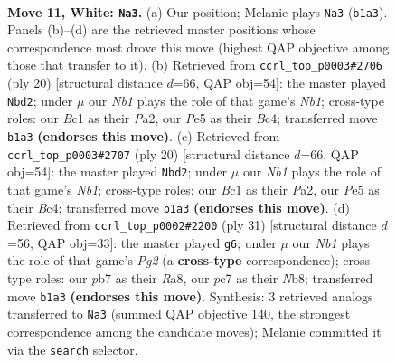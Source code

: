 \documentclass[11pt]{article}
\begin{document}
\clearpage

\begin{figure}[p]\centering
\begin{subfigure}{0.46\textwidth}\centering
\resizebox{\linewidth}{!}{%
\newchessgame
\chessboard[
  setfen={r3k2r/ppp1ppbp/1nn3p1/4P3/6b1/1B3N2/PPP2PPP/RNBK2R1 w kq - 1 11},
  showmover=false,
  pgfstyle=straightmove, color=movearrow, markmove={b1-a3}
]}
\caption{}
\end{subfigure}\hfill
\begin{subfigure}{0.46\textwidth}\centering
\resizebox{\linewidth}{!}{%
\newchessgame
\chessboard[
  setfen={r3k2r/1p3ppp/p1n1pn2/2b5/2B3b1/1P2PN2/PB3PPP/RN1R2K1 w kq - 2 11},
  showmover=false,
  pgfstyle=straightmove, color=movearrow, markmove={b1-d2}
]}
\caption{}
\end{subfigure}
\\[4pt]
\begin{subfigure}{0.46\textwidth}\centering
\resizebox{\linewidth}{!}{%
\newchessgame
\chessboard[
  setfen={r3k2r/1p3ppp/p1n1pn2/2b5/2B3b1/1P2PN2/PB3PPP/RN1R2K1 w kq - 2 11},
  showmover=false,
  pgfstyle=straightmove, color=movearrow, markmove={b1-d2}
]}
\caption{}
\end{subfigure}\hfill
\begin{subfigure}{0.46\textwidth}\centering
\resizebox{\linewidth}{!}{%
\newchessgame
\chessboard[
  setfen={rnb1k2r/pp2bppp/2p5/3pPn2/5PB1/1N2N3/PB1P2PP/R3K2R b KQkq - 11 16},
  showmover=false,
  pgfstyle=straightmove, color=movearrow, markmove={g7-g6}
]}
\caption{}
\end{subfigure}
\caption{\textbf{Move 11, White: \texttt{Na3}.} (a) Our position; Melanie plays \texttt{Na3} (\texttt{b1a3}). Panels (b)--(d) are the retrieved master positions whose correspondence most drove this move (highest QAP objective among those that transfer to it). (b) Retrieved from \texttt{ccrl\_top\_p0003\#2706} (ply 20) [structural distance $d$=66, QAP obj=54]: the master played \texttt{Nbd2}; under $\mu$ our \emph{Nb1} plays the role of that game's \emph{Nb1}; cross-type roles: our \emph{B}c1 as their \emph{P}a2, our \emph{P}e5 as their \emph{B}c4; transferred move \texttt{b1a3} \textbf{(endorses this move)}. (c) Retrieved from \texttt{ccrl\_top\_p0003\#2707} (ply 20) [structural distance $d$=66, QAP obj=54]: the master played \texttt{Nbd2}; under $\mu$ our \emph{Nb1} plays the role of that game's \emph{Nb1}; cross-type roles: our \emph{B}c1 as their \emph{P}a2, our \emph{P}e5 as their \emph{B}c4; transferred move \texttt{b1a3} \textbf{(endorses this move)}. (d) Retrieved from \texttt{ccrl\_top\_p0002\#2200} (ply 31) [structural distance $d$=56, QAP obj=33]: the master played \texttt{g6}; under $\mu$ our \emph{Nb1} plays the role of that game's \emph{Pg2} (a \textbf{cross-type} correspondence); cross-type roles: our \emph{p}b7 as their \emph{R}a8, our \emph{p}c7 as their \emph{N}b8; transferred move \texttt{b1a3} \textbf{(endorses this move)}. Synthesis: 3 retrieved analogs transferred to \texttt{Na3} (summed QAP objective 140, the strongest correspondence among the candidate moves); Melanie committed it via the \texttt{search} selector.}
\label{fig:thought-m20}
\end{figure}
\end{document}
